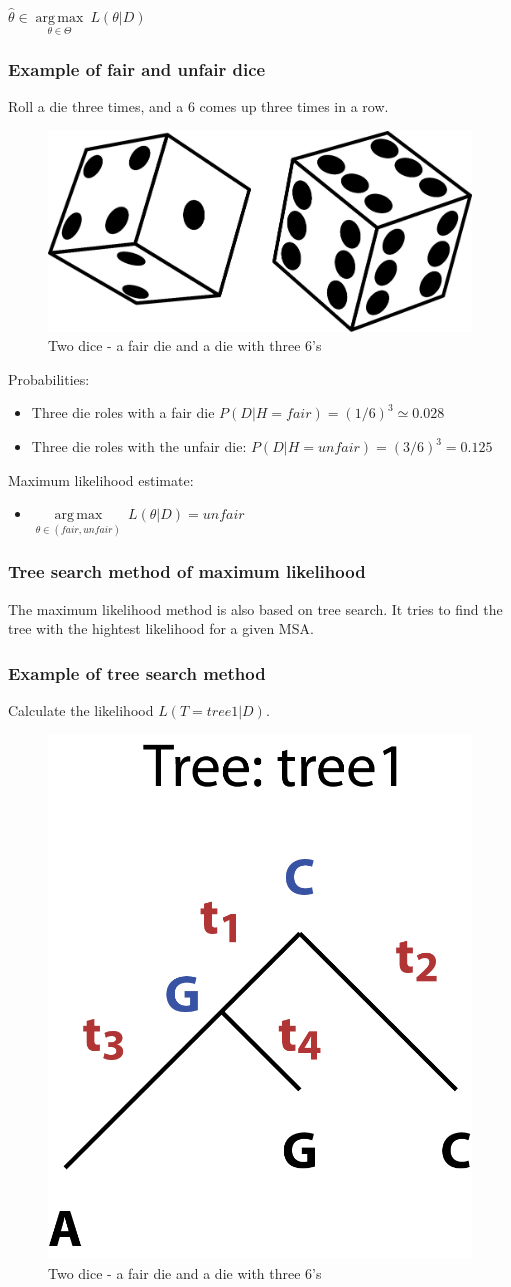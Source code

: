 ${\displaystyle {\hat {\theta }}\in {\underset {\theta \in \Theta }{\operatorname {arg\,max} }}\ L(\theta|D)}$

%
%
\subsubsection*{Example of fair and unfair dice}
Roll a die three times, and a 6 comes up three times in a row.

\begin{figure}[H]
  \centering
      \includegraphics[width=0.3 \textwidth]{fig09/dice_unfair.png}
        \caption{Two dice - a fair die and a die with three 6’s}
\end{figure}

\noindent
Probabilities:
\begin{itemize}
\item Three die roles with a fair die $P(D|H = fair) = (1/6)^3 \simeq 0.028$
\item Three die roles with the unfair die: $P(D|H = unfair) =(3/6)^3 = 0.125$
\end{itemize}

\noindent
Maximum likelihood estimate:
\begin{itemize}
\item ${\displaystyle {\underset {\theta \in (fair, unfair) }{\operatorname {arg\,max} }}\ L(\theta|D)} = unfair$
\end{itemize}

%
%
\subsubsection*{Tree search method of maximum likelihood}
The maximum likelihood method is also based on tree search. It tries to find the tree with the hightest likelihood for a given MSA.

%
%
\subsubsection*{Example of tree search method }
Calculate the likelihood $L(T=tree1|D )$.
 
 \begin{figure}[H]
  \centering
      \includegraphics[width=0.2 \textwidth]{fig09/ml_tree.png}
      \caption{Two dice - a fair die and a die with three 6’s}
\end{figure}
 

